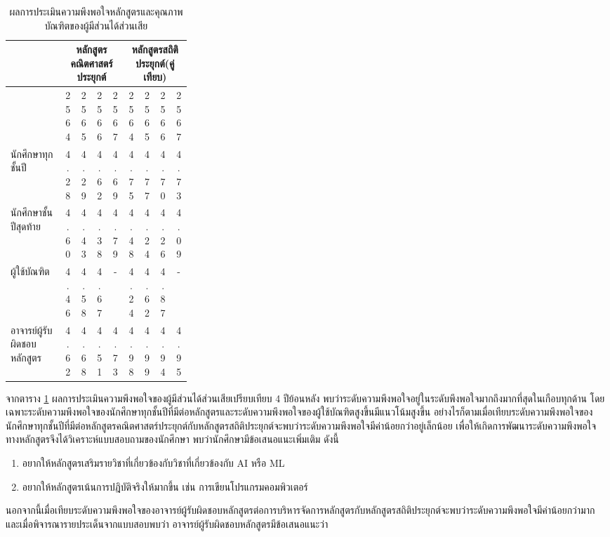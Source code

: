 \begin{longtable}{|>{\centering\arraybackslash}p{0.3\linewidth}|*{8}{c|}} 
\caption{ผลการประเมินความพึงพอใจหลักสูตรและคุณภาพบัณฑิตของผู้มีส่วนได้ส่วนเสีย}	
	\label{Table:8.5-1}\\
	\hline
	\multicolumn{1}{|>{\centering\arraybackslash}p{0.3\linewidth}|}{\textbf{การประเมินความพึงพอใจของผู้มีส่วนได้ส่วนเสีย}} &
	\multicolumn{4}{c|}{\textbf{หลักสูตรคณิตศาสตร์ประยุกต์}} &
	\multicolumn{4}{c|}{\textbf{หลักสูตรสถิติประยุกต์(คู่เทียบ)}} \\
	\cline{2-9}
	\multicolumn{1}{|c|}{} &
	\multicolumn{1}{c|}{2564} &
	\multicolumn{1}{c|}{2565} &
	\multicolumn{1}{c|}{2566} &
	\multicolumn{1}{c|}{2567} &
	\multicolumn{1}{c|}{2564} &
	\multicolumn{1}{c|}{2565} &
	\multicolumn{1}{c|}{2566} &
	\multicolumn{1}{c|}{2567} \\
	\hline
	\endhead
	
	นักศึกษาทุกชั้นปี & 4.28 & 4.29 & 4.62 & 4.69 & 4.75 & 4.77 & 4.70 & 4.73 \\
	\hline
	นักศึกษาชั้นปีสุดท้าย & 4.60 & 4.43 & 4.38 & 4.79 & 4.48 & 4.24 & 4.26 & 4.09 \\
	\hline
	ผู้ใช้บัณฑิต & 4.46 & 4.58 & 4.67 & - & 4.24 & 4.62 & 4.87 & - \\
	\hline
	อาจารย์ผู้รับผิดชอบหลักสูตร & 4.62 & 4.68 & 4.51 & 4.73 & 4.98 & 4.99 & 4.94 & 4.95 \\
	\hline

\end{longtable}




จากตาราง \ref{Table:8.5-1} ผลการประเมินความพึงพอใจของผู้มีส่วนได้ส่วนเสียเปรียบเทียบ 4 ปีย้อนหลัง พบว่าระดับความพึงพอใจอยู่ในระดับพึงพอใจมากถึงมากที่สุดในเกือบทุกด้าน โดยเฉพาะระดับความพึงพอใจของนักศึกษาทุกชั้นปีที่มีต่อหลักสูตรและระดับความพึงพอใจของผู้ใช้บัณฑิตสูงขึ้นมีแนวโน้มสูงขึ้น อย่างไรก็ตามเมื่อเทียบระดับความพึงพอใจของนักศึกษาทุกชั้นปีที่มีต่อหลักสูตรคณิตศาสตร์ประยุกต์กับหลักสูตรสถิติประยุกต์จะพบว่าระดับความพึงพอใจมีค่าน้อยกว่าอยู่เล็กน้อย เพื่อให้เกิดการพัฒนาระดับความพึงพอใจทางหลักสูตรจึงได้วิเคราะห์แบบสอบถามของนักศึกษา พบว่านักศึกษามีข้อเสนอแนะเพิ่มเติม ดังนี้
\begin{enumerate}
	\item อยากให้หลักสูตรเสริมรายวิชาที่เกี่ยวข้องกับวิชาที่เกี่ยวข้องกับ AI หรือ ML
    \item อยากให้หลักสูตรเน้นการปฎิบัติจริงให้มากขึ้น เช่น การเขียนโปรแกรมคอมพิวเตอร์
\end{enumerate}
นอกจากนี้เมื่อเทียบระดับความพึงพอใจของอาจารย์ผู้รับผิดชอบหลักสูตรต่อการบริหารจัดการหลักสูตรกับหลักสูตรสถิติประยุกต์จะพบว่าระดับความพึงพอใจมีค่าน้อยกว่ามาก และเมื่อพิจารณารายประเด็นจากแบบสอบพบว่า อาจารย์ผู้รับผิดชอบหลักสูตรมีข้อเสนอแนะว่า 

